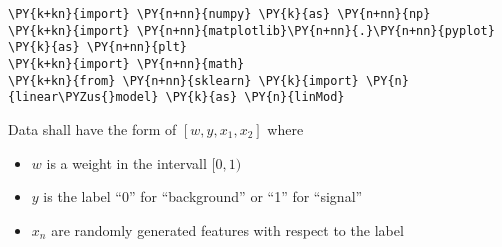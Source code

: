 
{\par%
\vspace{-1\baselineskip}%
}%
\begin{notebookcell}[]%
\begin{addmargin}[\cellleftmargin]{0em}%
{\smaller%
\par%
%
\vspace{-1\smallerfontscale}%
\begin{Verbatim}[commandchars=\\\{\}]
\PY{k+kn}{import} \PY{n+nn}{numpy} \PY{k}{as} \PY{n+nn}{np}
\PY{k+kn}{import} \PY{n+nn}{matplotlib}\PY{n+nn}{.}\PY{n+nn}{pyplot} \PY{k}{as} \PY{n+nn}{plt}
\PY{k+kn}{import} \PY{n+nn}{math}
\PY{k+kn}{from} \PY{n+nn}{sklearn} \PY{k}{import} \PY{n}{linear\PYZus{}model} \PY{k}{as} \PY{n}{linMod}
\end{Verbatim}
%
\par%
\vspace{-1\smallerfontscale}}%
\end{addmargin}
\end{notebookcell}


    Data shall have the form of \([w,y,x_1,x_2]\) where

\begin{itemize}
\tightlist
\item
  \(w\) is a weight in the intervall \([0,1)\)
\item
  \(y\) is the label ``0'' for ``background'' or ``1'' for ``signal''
\item
  \(x_n\) are randomly generated features with respect to the label
\end{itemize}


